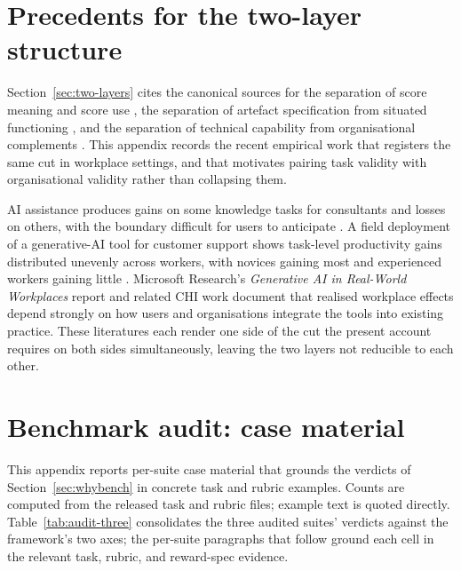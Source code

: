 \documentclass{article}
\begin{document}
\section{Precedents for the two-layer structure}
\label{app:precedents}

Section~\ref{sec:two-layers} cites the canonical sources for the separation of score meaning and score use \citep{messick1989validity,jacobs2021measurement}, the separation of artefact specification from situated functioning \citep{suchman1987plans}, and the separation of technical capability from organisational complements \citep{bresnahan2002it}.
This appendix records the recent empirical work that registers the same cut in workplace settings, and that motivates pairing task validity with organisational validity rather than collapsing them.

AI assistance produces gains on some knowledge tasks for consultants and losses on others, with the boundary difficult for users to anticipate \citep{dellacqua2023jagged}.
A field deployment of a generative-AI tool for customer support shows task-level productivity gains distributed unevenly across workers, with novices gaining most and experienced workers gaining little \citep{brynjolfsson2023genai}.
Microsoft Research's \emph{Generative AI in Real-World Workplaces} report \citep{microsoft2024workplaces} and related CHI work \citep{tankelevitch2024metacognitive} document that realised workplace effects depend strongly on how users and organisations integrate the tools into existing practice.
These literatures each render one side of the cut the present account requires on both sides simultaneously, leaving the two layers not reducible to each other.

\section{Benchmark audit: case material}
\label{app:benchcases}

This appendix reports per-suite case material that grounds the verdicts of Section~\ref{sec:whybench} in concrete task and rubric examples.
Counts are computed from the released task and rubric files; example text is quoted directly.
Table~\ref{tab:audit-three} consolidates the three audited suites' verdicts against the framework's two axes; the per-suite paragraphs that follow ground each cell in the relevant task, rubric, and reward-spec evidence.
\end{document}
